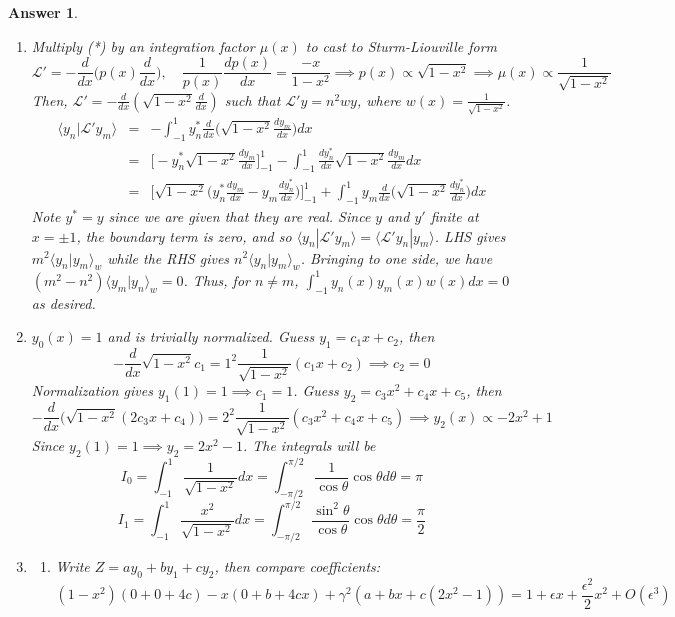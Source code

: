 \documentclass[a4paper]{article}
\newtheorem{ans}{Answer}[section]
\theoremstyle{new}
\begin{document}
\begin{ans}\leavevmode
\begin{enumerate}[label=(\alph*)]
\item
Multiply (*) by an integration factor $\mu(x)$ to cast to Sturm-Liouville form $$\mathcal{L'}=-\frac{d}{dx}\bigg(p(x)\frac{d}{dx}\bigg),\quad \frac{1}{p(x)}\frac{dp(x)}{dx}=\frac{-x}{1-x^2}\implies p(x)\propto\sqrt{1-x^2}\implies\mu(x)\propto\frac{1}{\sqrt{1-x^2}}$$
Then, $\mathcal{L}'=-\frac{d}{dx}(\sqrt{1-x^2}\frac{d}{dx})$ such that $\mathcal{L}'y=n^2wy$, where $w(x)=\frac{1}{\sqrt{1-x^2}}$.
\begin{eqnarray}
\langle y_n|\mathcal{L}'y_m\rangle&=&-\int_{-1}^1 y_n^*\frac{d}{dx}\bigg(\sqrt{1-x^2}\frac{dy_m}{dx}\bigg)dx\nonumber\\&=&\bigg[-y_n^*\sqrt{1-x^2}\frac{dy_m}{dx}\bigg]_{-1}^1-\int_{-1}^1 \frac{dy_n^*}{dx}\sqrt{1-x^2}\frac{dy_m}{dx}dx\nonumber\\&=&\bigg[\sqrt{1-x^2}\bigg(y_n^*\frac{dy_m}{dx}-y_m\frac{dy_n^*}{dx}\bigg)\bigg]_{-1}^1+\int_{-1}^1 y_m\frac{d}{dx}\bigg(\sqrt{1-x^2}\frac{dy_n^*}{dx}\bigg)dx\nonumber
\end{eqnarray}
Note $y^*=y$ since we are given that they are real. Since $y$ and $y'$ finite at $x=\pm 1$, the boundary term is zero, and so $\langle y_n|\mathcal{L}'y_m\rangle=\langle\mathcal{L}'y_n|y_m\rangle$. LHS gives $m^2\langle y_n|y_m\rangle_w$ while the RHS gives $n^2\langle y_n|y_m\rangle_w$. Bringing to one side, we have $(m^2-n^2)\langle y_m|y_n\rangle_w=0$. Thus, for $n\neq m$, $\int_{-1}^1y_n(x)y_m(x)w(x)dx=0$ as desired.
\item $y_0(x)=1$ and is trivially normalized. Guess $y_1=c_1x+c_2$, then
$$-\frac{d}{dx}\sqrt{1-x^2}c_1=1^2\frac{1}{\sqrt{1-x^2}}(c_1x+c_2)\implies c_2=0$$
Normalization gives $y_1(1)=1\implies c_1=1$. Guess $y_2=c_3x^2+c_4x+c_5$, then
$$-\frac{d}{dx}\bigg(\sqrt{1-x^2}(2c_3x+c_4)\bigg)=2^2\frac{1}{\sqrt{1-x^2}}(c_3x^2+c_4x+c_5)\implies y_2(x)\propto -2x^2+1$$
Since $y_2(1)=1\implies y_2=2x^2-1$. The integrals will be
$$I_0=\int_{-1}^1\frac{1}{\sqrt{1-x^2}}dx=\int_{-\pi/2}^{\pi/2}\frac{1}{\cos\theta}\cos\theta d\theta=\pi$$
$$I_1=\int_{-1}^1\frac{x^2}{\sqrt{1-x^2}}dx=\int_{-\pi/2}^{\pi/2}\frac{\sin^2\theta}{\cos\theta}\cos\theta d\theta=\frac{\pi}{2}$$
\item 
\begin{enumerate}[label=(\roman*)]
\item Write $Z=ay_0+by_1+cy_2$, then compare coefficients:
$$(1-x^2)(0+0+4c)-x(0+b+4cx)+\gamma^2(a+bx+c(2x^2-1))=1+\epsilon x+\frac{\epsilon^2}{2}x^2+O(\epsilon^3)$$

\end{enumerate}
\end{enumerate}
\end{ans}
\end{document}
